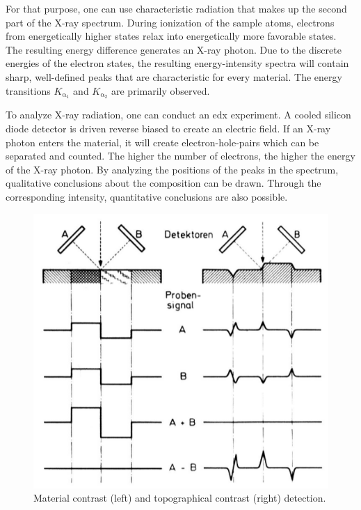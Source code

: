 For that purpose, one can use characteristic radiation that makes up
the second part of the X-ray spectrum.
During ionization of the sample atoms, electrons from energetically
higher states relax into energetically more favorable states.
The resulting energy difference generates an X-ray photon.
Due to the discrete energies of the electron states,
the resulting energy-intensity spectra will contain sharp, well-defined
peaks that are characteristic for every material.
The energy transitions $K_{\mathrm{\alpha}_{1}}$ and
$K_{\mathrm{\alpha}_{2}}$ are primarily observed.

To analyze X-ray radiation, one can conduct an \ac{edx} experiment.
A cooled silicon diode detector is driven reverse biased to create an
electric field.
If an X-ray photon enters the material, it will create electron-hole-pairs
which can be separated and counted.
The higher the number of electrons, the higher the energy of the X-ray
photon.
By analyzing the positions of the peaks in the spectrum, qualitative
conclusions about the composition can be drawn.
Through the corresponding intensity, quantitative conclusions are also
possible.

\begin{figure}[h]
	\centering
	\includegraphics[width=0.95\linewidth]{../assets/material.png}
	\caption{Material contrast (left) and topographical contrast (right) detection.
		}
	\label{fig:material_contrast}
\end{figure}
